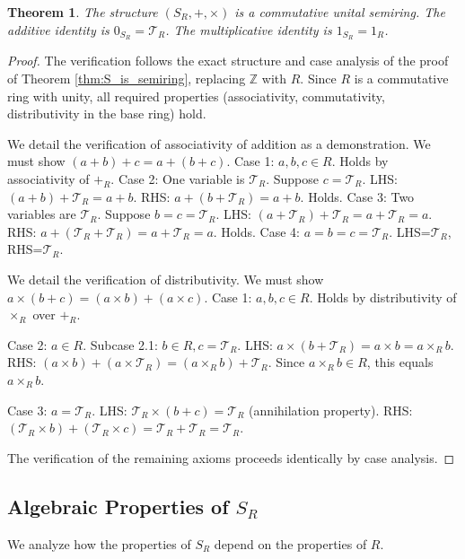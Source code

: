 \documentclass[11pt, a4paper]{article}
\theoremstyle{plain}
\newtheorem{theorem}{Theorem}[section]
\theoremstyle{definition}
\numberwithin{equation}{section}
\newcommand{\Z}{\mathbb{Z}}
\newcommand{\Tobj}{\mathcal{T}} %
\newcommand{\SR}{S_{R}}
\begin{document}
\begin{theorem}\label{thm:SR_is_semiring}
The structure $(\SR, +, \times)$ is a commutative unital semiring. The additive identity is $0_{\SR}=\Tobj_R$. The multiplicative identity is $1_{\SR}=1_{R}$.
\end{theorem}
\begin{proof}
The verification follows the exact structure and case analysis of the proof of Theorem \ref{thm:S_is_semiring}, replacing $\Z$ with $R$. Since $R$ is a commutative ring with unity, all required properties (associativity, commutativity, distributivity in the base ring) hold.

We detail the verification of associativity of addition as a demonstration.
We must show $(a+b)+c = a+(b+c)$.
Case 1: $a, b, c \in R$. Holds by associativity of $+_{R}$.
Case 2: One variable is $\Tobj_R$. Suppose $c=\Tobj_R$.
LHS: $(a+b)+\Tobj_R = a+b$.
RHS: $a+(b+\Tobj_R) = a+b$. Holds.
Case 3: Two variables are $\Tobj_R$. Suppose $b=c=\Tobj_R$.
LHS: $(a+\Tobj_R)+\Tobj_R = a+\Tobj_R = a$.
RHS: $a+(\Tobj_R+\Tobj_R) = a+\Tobj_R = a$. Holds.
Case 4: $a=b=c=\Tobj_R$. LHS=$\Tobj_R$, RHS=$\Tobj_R$.

We detail the verification of distributivity.
We must show $a\times(b+c) = (a\times b) + (a\times c)$.
Case 1: $a, b, c \in R$. Holds by distributivity of $\times_{R}$ over $+_{R}$.

Case 2: $a \in R$.
Subcase 2.1: $b \in R, c=\Tobj_R$.
LHS: $a\times(b+\Tobj_R) = a\times b = a\times_{R} b$.
RHS: $(a\times b) + (a\times\Tobj_R) = (a\times_{R} b) + \Tobj_R$. Since $a\times_{R} b \in R$, this equals $a\times_{R} b$.

Case 3: $a=\Tobj_R$.
LHS: $\Tobj_R\times(b+c) = \Tobj_R$ (annihilation property).
RHS: $(\Tobj_R\times b) + (\Tobj_R\times c) = \Tobj_R+\Tobj_R = \Tobj_R$.

The verification of the remaining axioms proceeds identically by case analysis.
\end{proof}

\subsection{Algebraic Properties of \texorpdfstring{$\SR$}{S\_R}}

We analyze how the properties of $\SR$ depend on the properties of $R$.
\end{document}
